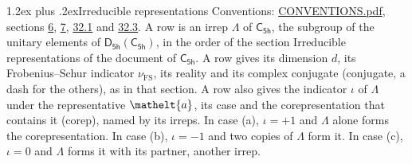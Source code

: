 \documentclass[10pt,a4paper]{article}
\makeatletter
\renewcommand\section{\@startsection{section}{1}{\z@}{-3ex plus -1ex minus -.2ex}%
  {1.2ex plus .2ex}{\normalfont\large\sffamily\bfseries\color{parttitle}}}
\numberwithin{equation}{section}
\newcommand{\eltfont}[1]{{\let\sigma\eltsigma\mathelt{#1}}}
\newcommand{\grp}[1]{\mathsf{#1}}
\newcommand{\elt}[1]{\eltfont{#1}}
\newcommand{\fsind}{\nu_{\mathrm{FS}}}
\makeatother
\begin{document}
\section{Irreducible representations}\label{s:irreps}
Conventions: \href{../../CONVENTIONS.pdf}{CONVENTIONS.pdf}, sections \href{../../../rotation/CONVENTIONS.pdf\#conv.6}{6}, \href{../../../rotation/CONVENTIONS.pdf\#conv.7}{7}, \href{../../CONVENTIONS.pdf\#conv.32.1}{32.1} and \href{../../CONVENTIONS.pdf\#conv.32.3}{32.3}.
\leavevmode\label{n:irrep.Delta}A row is an irrep $\Lambda$ of $\grp{C_{5h}}$, the subgroup of the unitary elements of $\grp{D_{5h}}(\grp{C_{5h}})$, in the order of the section Irreducible representations of the document of \href{../../../rotation/data/pdf/C5h.pdf}{$\grp{C_{5h}}$}. \label{n:index.dimension}\label{n:index.frobenius}\label{n:head.irrep}\label{n:head.reality}\label{n:head.conjugate}A row gives its dimension $d$, its Frobenius--Schur indicator $\fsind$, its reality and its complex conjugate (conjugate, a dash for the others), as in that section. \label{n:head.case.corep}\label{n:head.corep}A row also gives the indicator $\iota$ of $\Lambda$ under the representative $\elt{a}$, its case and the corepresentation that contains it (corep), named by its irreps. In case (a), $\iota = +1$ and $\Lambda$ alone forms the corepresentation. In case (b), $\iota = -1$ and two copies of $\Lambda$ form it. In case (c), $\iota = 0$ and $\Lambda$ forms it with its partner, another irrep.
\setlength{\emergencystretch}{2em}\par\setlength{\emergencystretch}{0pt}
\end{document}
